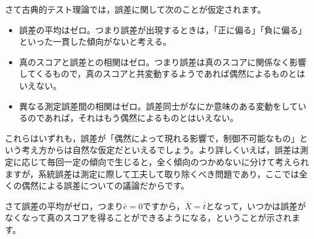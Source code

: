 \documentclass{ltjsbook}
\begin{document}
さて古典的テスト理論では，誤差に関して次のことが仮定されます。
\begin{itemize}
    \item 誤差の平均はゼロ。つまり誤差が出現するときは，「正に偏る」「負に偏る」といった一貫した傾向がないと考える。
    \item 真のスコアと誤差との相関はゼロ。つまり誤差は真のスコアに関係なく影響してくるもので，真のスコアと共変動するようであれば偶然によるものとはいえない。
    \item 異なる測定誤差間の相関はゼロ。誤差同士がなにか意味のある変動をしているのであれば，それはもう偶然によるものとはいえない。
\end{itemize}

これらはいずれも，誤差が「偶然によって現れる影響で，制御不可能なもの」という考え方からは自然な仮定だといえるでしょう。より詳しくいえば，誤差は測定に応じて毎回一定の傾向で生じると，全く傾向のつかめないに分けて考えられますが，系統誤差は測定に際して工夫して取り除くべき問題であり，ここでは全くの偶然による誤差についての議論だからです。

さて誤差の平均がゼロ，つまり$\bar{e}=0$ですから，$\bar{X}=\bar{t}$となって，いつかは誤差がなくなって真のスコアを得ることができるようになる，ということが示されます。
\end{document}

